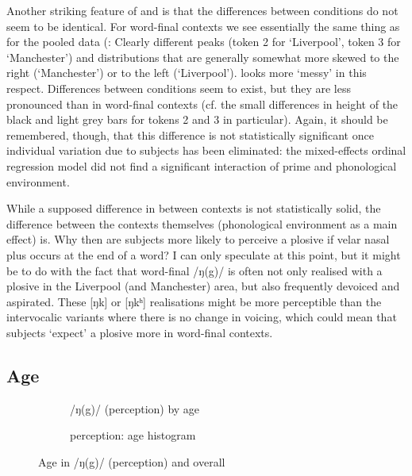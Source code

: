 Another striking feature of  and  is that the differences between  conditions do not seem to be identical.
For word-final contexts we see essentially the same thing as for the pooled data (: Clearly different peaks (token 2 for `Liverpool', token 3 for `Manchester') and distributions that are generally somewhat more skewed to the right (`Manchester') or to the left (`Liverpool').
 looks more `messy' in this respect.
Differences between  conditions seem to exist, but they are less pronounced than in word-final contexts (cf. the small differences in height of the black and light grey bars for tokens 2 and 3 in particular).
Again, it should be remembered, though, that this difference is not statistically significant once individual variation due to subjects has been eliminated: the mixed-effects ordinal regression model did not find a significant interaction of prime and phonological environment.

While a supposed difference in  between contexts is not statistically solid, the difference between the contexts themselves (phonological environment as a main effect) is.
Why then are subjects more likely to perceive a plosive if velar nasal plus occurs at the end of a word?
I can only speculate at this point, but it might be to do with the fact that word-final /ŋ(g)/ is often not only realised with a plosive in the Liverpool (and Manchester) area, but also frequently devoiced and aspirated.
These [ŋk] or [ŋkʰ] realisations might be more perceptible than the intervocalic variants where there is no change in voicing, which could mean that subjects `expect' a plosive more in word-final contexts.

\subsection{Age}
\label{sec.perc_res.ng.age}

\begin{figure}
	
	\begin{subfigure}{.49\textwidth}
		
			\resizebox{\linewidth}{!}{} 
		\caption{/ŋ(g)/ (perception)  by age}
		\label{fig.scatter.ng.ext.age}
	\end{subfigure}
	\begin{subfigure}{.49\textwidth}
		
			\resizebox{\linewidth}{!}{} 
		\caption{perception: age histogram}
		\label{fig.hist.ext.age}
	\end{subfigure}			
	\caption{Age in /ŋ(g)/ (perception) and overall}
\end{figure}

